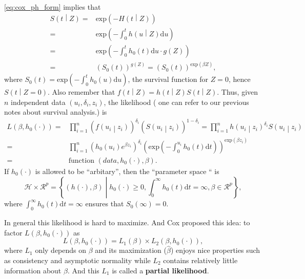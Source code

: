 \documentclass[a4paper,12pt]{article}
\begin{document}
\eqref{eq:cox_ph_form} implies that
\[
  \begin{aligned}
    S\left(t\middle|Z\right)
    =& \mathrm{exp}\left(-H\left(t\middle|Z\right)\right)    \\
    =& \mathrm{exp}\left(-\int_0^th\left(u\middle|Z\right)\mathrm{d}u\right)    \\
    =& \mathrm{exp}\left(-\int_0^th_0\left(t\right)\mathrm{d}u \cdot g\left(Z\right)\right)    \\
    =& \left(S_0\left(t\right)\right)^{g\left(Z\right)}
    = \left(S_0\left(t\right)\right)^{\mathrm{exp}\left(\beta Z\right)}
    ,
  \end{aligned}
\]
where $S_0\left(t\right) = \mathrm{exp}\left( - \int_0^t h_0\left(u\right)\mathrm{d}u\right)$, the survival function for $Z = 0$, hence $S\left(t\middle|Z = 0\right)$. Also remember that $f\left(t\middle|Z\right) = h\left(t\middle|Z\right) S\left(t\middle|Z\right)$. Thus, given $n$ independent data $\left(u_i, \delta_i, z_i\right)$, the likelihood ({\color{blue} one can refer to our previous notes about survival analysis.}) is
\begin{equation}
  \label{eq:general_full_likelihood}
    \begin{aligned}
    L\left(\beta, h_0\left(\cdot\right)\right)
    =& \prod\limits_{i = 1}^n
    \left(
      f\left(u_i\middle|z_i\right)
    \right)^{\delta_i}
    \left(
      S\left(u_i\middle|z_i\right)
    \right)^{1 - \delta_i}
    = \prod\limits_{i = 1}^n
    h\left(u_i\middle|z_i\right)^{\delta_i}
    S\left(u_i\middle|z_i\right)    \\
    =& \prod\limits_{i = 1}^n
    \left(
      h_0\left(u_i\right)
      e^{\beta z_i}
    \right)^{\delta_i}
    \left(
      \mathrm{exp}\left(-\int_0^{u_i}h_0\left(t\right)\mathrm{d}t\right)
    \right)^{\mathrm{exp}\left(\beta z_i\right)}    \\
    =& \text{function $\left(data, h_0\left(\cdot\right), \beta\right)$}.
  \end{aligned}
\end{equation}
If $h_0\left(\cdot\right)$ is allowed to be ``arbitary'', then the ``parameter space `` is
\[
  \mathcal{H} \times \mathcal{R}^p
  = \left\{
    \left(h\left(\cdot\right), \beta\right)
    \middle|
    h_0\left(\cdot\right) \geq 0,
    \int_0^\infty h_0\left(t\right)\mathrm{d}t = \infty,
    \beta \in \mathcal{R}^p
  \right\}
  ,
\]
where $\int_0^\infty h_0\left(t\right)\mathrm{d}t = \infty$ ensures that $S_0\left(\infty\right) = 0$.
\par
In general this likelihood is hard to maximize. And Cox proposed this idea: to factor $L\left(\beta, h_0\left(\cdot\right)\right)$ as
\[
  L\left(\beta, h_0\left(\cdot\right)\right)
  = L_1\left(\beta\right)
  \times
  L_2\left(\beta, h_0\left(\cdot\right)\right)
  ,
\]
where $L_1$ only depends on $\beta$ and its maximization ($\hat{\beta}$) enjoys nice properties such as consistency and asymptotic normality while $L_2$ contains relatively little information about $\beta$. And this $L_1$ is called a \textbf{partial likelihood}.
\end{document}
